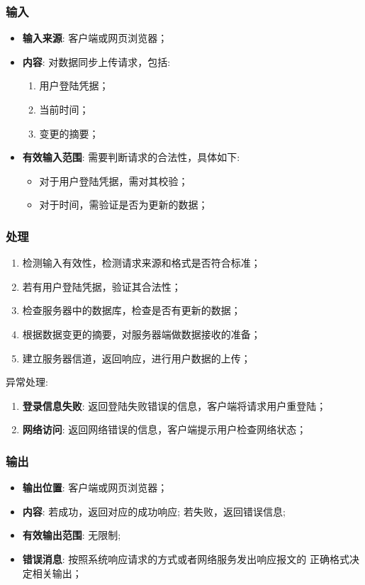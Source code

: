 \subsubsection{输入}
	\begin{itemize}
		\item \textbf{输入来源}: 客户端或网页浏览器；
		\item \textbf{内容}: 对数据同步上传请求，包括: 
		\begin{enumerate}
			\item 用户登陆凭据；
			\item 当前时间；
			\item 变更的摘要；
		\end{enumerate}
		\item \textbf{有效输入范围}: 需要判断请求的合法性，具体如下: 
		\begin{itemize}
			\item 对于用户登陆凭据，需对其校验； 
			\item 对于时间，需验证是否为更新的数据； 
		\end{itemize}
	\end{itemize}
\subsubsection{处理}
	\begin{enumerate}
		\item 检测输入有效性，检测请求来源和格式是否符合标准；
		\item 若有用户登陆凭据，验证其合法性；
		\item 检查服务器中的数据库，检查是否有更新的数据；
		\item 根据数据变更的摘要，对服务器端做数据接收的准备；
		\item 建立服务器信道，返回响应，进行用户数据的上传；
	\end{enumerate}
	\noindent 异常处理: 
	\begin{enumerate}
		\item \textbf{登录信息失败}: 返回登陆失败错误的信息，客户端将请求用户重登陆；
		\item \textbf{网络访问}: 返回网络错误的信息，客户端提示用户检查网络状态；
	\end{enumerate}
\subsubsection{输出}
\begin{itemize}
	\item \textbf{输出位置}: 客户端或网页浏览器；
	\item \textbf{内容}: 若成功，返回对应的成功响应; 若失败，返回错误信息;
	\item \textbf{有效输出范围}: 无限制;
	\item \textbf{错误消息}: 按照系统响应请求的方式或者网络服务发出响应报文的
		正确格式决定相关输出；
\end{itemize}

